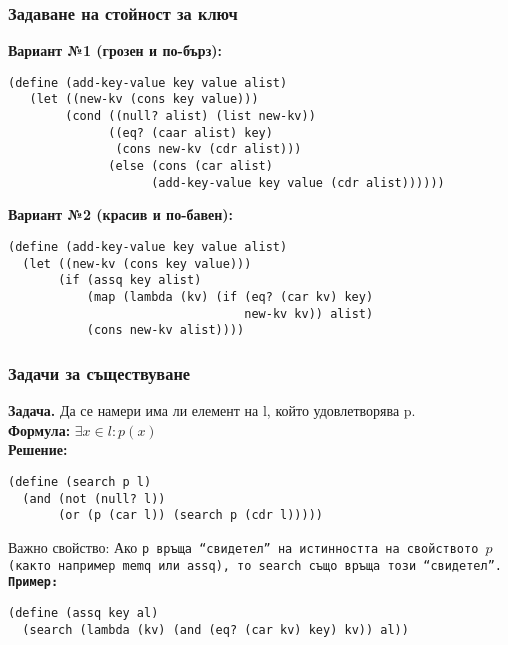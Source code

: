 \documentclass{beamer}
\begin{document}
\begin{frame}[fragile]
  \frametitle{Задаване на стойност за ключ}
\small
  \textbf{Вариант №1 (грозен и по-бърз):}
\begin{lstlisting}
(define (add-key-value key value alist)
   (let ((new-kv (cons key value)))
        (cond ((null? alist) (list new-kv))
              ((eq? (caar alist) key)
               (cons new-kv (cdr alist)))
              (else (cons (car alist)
                    (add-key-value key value (cdr alist))))))
\end{lstlisting}
  \pause
  \textbf{Вариант №2 (красив и по-бавен):}
\begin{lstlisting}
(define (add-key-value key value alist)
  (let ((new-kv (cons key value)))
       (if (assq key alist)
           (map (lambda (kv) (if (eq? (car kv) key)
                                 new-kv kv)) alist)
           (cons new-kv alist))))
\end{lstlisting}
\end{frame}

\begin{frame}[fragile]
  \frametitle{Задачи за съществуване}

  \textbf{Задача.} Да се намери има ли елемент на l, който удовлетворява p.\\
  \pause
  \textbf{Формула:} $\exists x\in l: p(x)$\\
  \pause
  \textbf{Решение:}
\begin{lstlisting}
(define (search p l)
  (and (not (null? l))
       (or (p (car l)) (search p (cdr l)))))
\end{lstlisting}
  \pause
  \alert{Важно свойство:} Ако \tt p връща ``свидетел'' на истинността на свойството $p$ (както например \tt{memq} или \tt{assq}), то \tt{search} също връща този ``свидетел''.\\
  \pause
  \textbf{Пример:}
\begin{lstlisting}
(define (assq key al)
  (search (lambda (kv) (and (eq? (car kv) key) kv)) al))
\end{lstlisting}
\end{frame}
\end{document}
